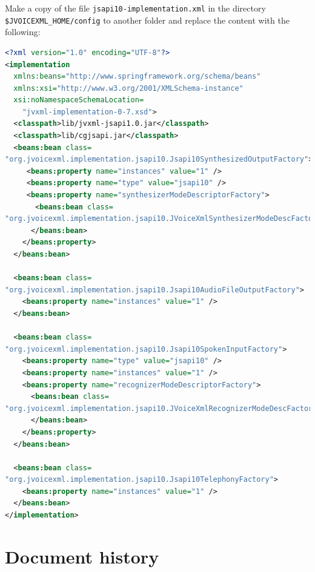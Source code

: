 \documentclass[11pt,a4paper]{article}
\begin{document}
Make a copy of the file \lstinline{jsapi10-implementation.xml} in the directory
\lstinline{$JVOICEXML_HOME/config} to another
folder and replace the content with the following:

\begin{lstlisting}[language=XML]
<?xml version="1.0" encoding="UTF-8"?>
<implementation
  xmlns:beans="http://www.springframework.org/schema/beans"
  xmlns:xsi="http://www.w3.org/2001/XMLSchema-instance"
  xsi:noNamespaceSchemaLocation=
    "jvxml-implementation-0-7.xsd">
  <classpath>lib/jvxml-jsapi1.0.jar</classpath>
  <classpath>lib/cgjsapi.jar</classpath>
  <beans:bean class=
"org.jvoicexml.implementation.jsapi10.Jsapi10SynthesizedOutputFactory">
     <beans:property name="instances" value="1" />
     <beans:property name="type" value="jsapi10" />
     <beans:property name="synthesizerModeDescriptorFactory">
       <beans:bean class=
"org.jvoicexml.implementation.jsapi10.JVoiceXmlSynthesizerModeDescFactory">
      </beans:bean>
    </beans:property>
  </beans:bean>

  <beans:bean class=
"org.jvoicexml.implementation.jsapi10.Jsapi10AudioFileOutputFactory">
    <beans:property name="instances" value="1" />
  </beans:bean>

  <beans:bean class=
"org.jvoicexml.implementation.jsapi10.Jsapi10SpokenInputFactory">
    <beans:property name="type" value="jsapi10" />
    <beans:property name="instances" value="1" />
    <beans:property name="recognizerModeDescriptorFactory">
      <beans:bean class=
"org.jvoicexml.implementation.jsapi10.JVoiceXmlRecognizerModeDescFactory">
      </beans:bean>
    </beans:property>
  </beans:bean>

  <beans:bean class=
"org.jvoicexml.implementation.jsapi10.Jsapi10TelephonyFactory">
    <beans:property name="instances" value="1" />
  </beans:bean>
</implementation>
\end{lstlisting}

\section*{Document history}
\end{document}
